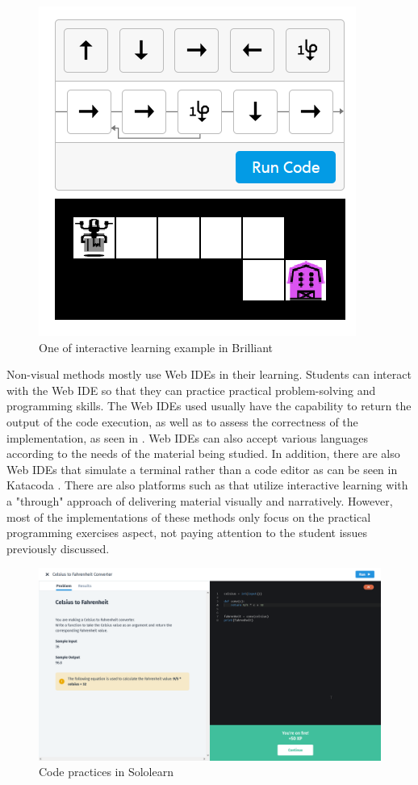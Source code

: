 \documentclass[conference]{IEEEtran}
\begin{document}
\begin{figure}[htbp]
  \centerline{\includegraphics[width=0.4\linewidth]{chapter2/brilliant.png}}
  \caption{\label{fig:brilliant}One of interactive learning example in Brilliant}
\end{figure}

Non-visual methods mostly use Web IDEs in their learning. Students can interact with the Web IDE so that they can practice practical problem-solving and programming skills. The Web IDEs used usually have the capability to return the output of the code execution, as well as to assess the correctness of the implementation, as seen in \cite{sololearn2021media}. Web IDEs can also accept various languages according to the needs of the material being studied. In addition, there are also Web IDEs that simulate a terminal rather than a code editor as can be seen in Katacoda \cite{katacoda2021media}. There are also platforms such as \cite{progate2021media} that utilize interactive learning with a "through" approach of delivering material visually and narratively. However, most of the implementations of these methods only focus on the practical programming exercises aspect, not paying attention to the student issues previously discussed.

\begin{figure}[htbp]
  \centerline{\includegraphics[width=\linewidth]{chapter2/sololearn.png}}
  \caption{\label{fig:sololearn}Code practices in Sololearn}
\end{figure}
\end{document}
